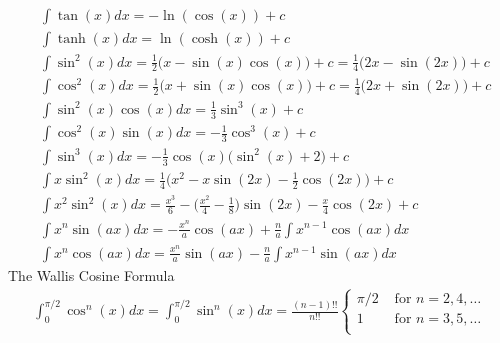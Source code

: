\begin{align}
	&\int \tan(x)dx = -\ln(\cos(x)) +c\\
	&\int \tanh(x)dx = \ln(\cosh(x))+c \\
	&\int \sin^2(x)dx = \frac{1}{2}\big(x-\sin(x)\cos(x)\big)+c = \frac{1}{4}\big(2x-\sin(2x)\big)+c\\
	&\int \cos^2(x)dx = \frac{1}{2}\big(x+\sin(x)\cos(x)\big)+c = \frac{1}{4}\big(2x+\sin(2x)\big)+c \\
	&\int \sin^2(x)\cos(x)dx = \frac{1}{3}\sin^3(x)+c \\
	&\int \cos^2(x)\sin(x)dx = -\frac{1}{3}\cos^3(x)+c \\
	&\int \sin^3(x)dx = -\frac{1}{3}\cos(x)\big(\sin^2(x)+2\big)+c \\
	&\int x\sin^2(x)dx = \frac{1}{4}\big(x^2-x\sin(2x)-\frac{1}{2}\cos(2x)\big)+c\\
	&\int x^2\sin^2(x)dx =\frac{x^3}{6}-\bigg(\frac{x^2}{4}-\frac{1}{8}\bigg)\sin(2x)-\frac{x}{4}\cos(2x)+c \\
	&\int x^n \sin(ax)dx = -\frac{x^n}{a}\cos(ax)+ \frac{n}{a}\int x^{n-1}\cos(ax)dx \\
	&\int x^n \cos(ax)dx = \frac{x^n}{a}\sin(ax)- \frac{n}{a}\int x^{n-1}\sin(ax)dx		
\end{align}
The Wallis Cosine Formula
\begin{align}
\int_{0}^{\pi/2}\cos^n(x) dx = \int_{0}^{\pi/2}\sin^n(x) dx = \frac{(n-1)!!}{n!!}
\begin{cases}
\pi/2 &\textrm{ for } n=2,4,\dots\\
1 &\textrm{ for } n=3,5,\dots\\
\end{cases}
\end{align}




\newpage
